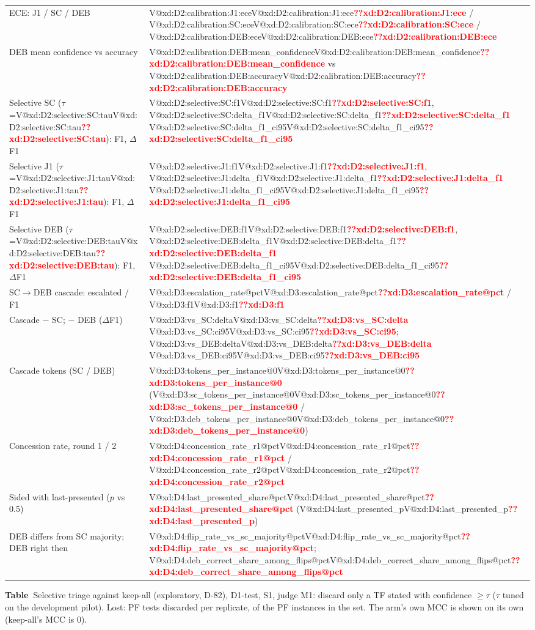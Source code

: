 \documentclass[pdflatex,iicol,sn-mathphys-num]{sn-jnl}
\makeatletter
\newcommand{\V}[1]{\ifcsname V@#1\endcsname\csname V@#1\endcsname\else\textbf{\textcolor{red}{??#1}}\fi}
\makeatother
\begin{document}
\begin{appendices}
\begin{minipage}{\columnwidth}
{\begin{tabularx}{\columnwidth}{@{}Y >{\raggedright\arraybackslash}p{3.45cm}@{}}
ECE: J1 / SC / DEB & \V{xd:D2:calibration:J1:ece} / \V{xd:D2:calibration:SC:ece} / \V{xd:D2:calibration:DEB:ece} \\
DEB mean confidence vs accuracy & \V{xd:D2:calibration:DEB:mean_confidence} vs \V{xd:D2:calibration:DEB:accuracy} \\
Selective SC ($\tau$=\V{xd:D2:selective:SC:tau}): F1, $\Delta$F1 & \V{xd:D2:selective:SC:f1}, \V{xd:D2:selective:SC:delta_f1} \V{xd:D2:selective:SC:delta_f1_ci95} \\
Selective J1 ($\tau$=\V{xd:D2:selective:J1:tau}): F1, $\Delta$F1 & \V{xd:D2:selective:J1:f1}, \V{xd:D2:selective:J1:delta_f1} \V{xd:D2:selective:J1:delta_f1_ci95} \\
Selective DEB ($\tau$=\V{xd:D2:selective:DEB:tau}): F1, $\Delta$F1 & \V{xd:D2:selective:DEB:f1}, \V{xd:D2:selective:DEB:delta_f1} \V{xd:D2:selective:DEB:delta_f1_ci95} \\
SC$\to$DEB cascade: escalated / F1 & \V{xd:D3:escalation_rate@pct} / \V{xd:D3:f1} \\
Cascade $-$ SC; $-$ DEB ($\Delta$F1) & \V{xd:D3:vs_SC:delta} \V{xd:D3:vs_SC:ci95}; \V{xd:D3:vs_DEB:delta} \V{xd:D3:vs_DEB:ci95} \\
Cascade tokens (SC / DEB) & \V{xd:D3:tokens_per_instance@0} (\V{xd:D3:sc_tokens_per_instance@0} / \V{xd:D3:deb_tokens_per_instance@0}) \\
Concession rate, round 1 / 2 & \V{xd:D4:concession_rate_r1@pct} / \V{xd:D4:concession_rate_r2@pct} \\
Sided with last-presented ($p$ vs 0.5) & \V{xd:D4:last_presented_share@pct} (\V{xd:D4:last_presented_p}) \\
DEB differs from SC majority; DEB right then & \V{xd:D4:flip_rate_vs_sc_majority@pct}; \V{xd:D4:deb_correct_share_among_flips@pct} \\
\bottomrule
\end{tabularx}
\par}\end{minipage}\par\medskip
\par\medskip\noindent\begin{minipage}{\columnwidth}{\footnotesize{}\label{tab:selka}\textbf{Table~\thetable}\enspace Selective triage against keep-all (exploratory, D-82), D1-test, S1, judge M1: discard only a TF stated with confidence $\geq\tau$ ($\tau$ tuned on the development pilot). Lost: PF tests discarded per replicate, of the PF instances in the set. The arm's own MCC is shown on its own (keep-all's MCC is 0).\par}\smallskip

\end{minipage}
\end{appendices}
\end{document}
